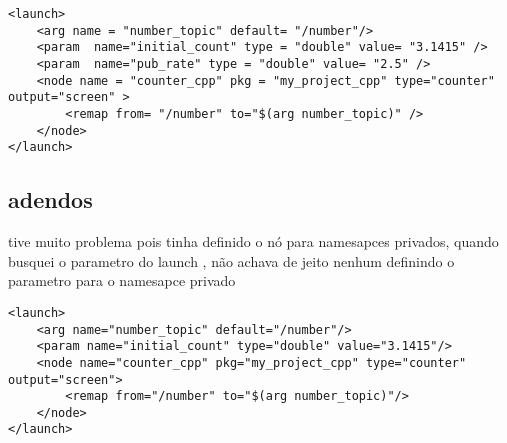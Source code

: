 \documentclass[letterpaper]{article}
\begin{document}
\begin{lstlisting}[style=xmlstyle, title=counter\_cpp.launch] 
<launch>
    <arg name = "number_topic" default= "/number"/>
    <param  name="initial_count" type = "double" value= "3.1415" />
    <param  name="pub_rate" type = "double" value= "2.5" />
    <node name = "counter_cpp" pkg = "my_project_cpp" type="counter" output="screen" >   
        <remap from= "/number" to="$(arg number_topic)" />  
    </node> 
</launch>
\end{lstlisting}
\subsection{adendos}
tive muito problema pois tinha definido o nó para namesapces privados, quando busquei o parametro do launch , não achava de jeito nenhum
definindo o parametro para o namesapce privado
\begin{lstlisting}[style=xmlStyle, title=counter\_cpp.launch] 
<launch>
    <arg name="number_topic" default="/number"/>
    <param name="initial_count" type="double" value="3.1415"/>
    <node name="counter_cpp" pkg="my_project_cpp" type="counter" output="screen">
        <remap from="/number" to="$(arg number_topic)"/>
    </node>
</launch>
\end{lstlisting}
\end{document}
